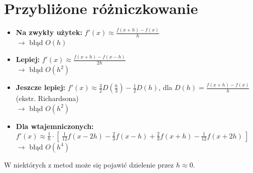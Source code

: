 \section{Przybliżone różniczkowanie}
\begin{itemize}
	\item \textbf{Na zwykły użytek:} \( f'(x) \approx \frac{f(x+h) - f(x)}{h} \) \\
	      \( \rightarrow \) błąd \( O(h) \)
	\item \textbf{Lepiej:} \( f'(x) \approx \frac{f(x+h) - f(x-h)}{2h} \) \\
	      \( \rightarrow \) błąd \( O(h^2) \)
	\item \textbf{Jeszcze lepiej:} \( f'(x) \approx \frac{3}{2}D\!\left(\frac{h}{3}\right) - \frac{1}{2}D(h) \), dla \( D(h) = \frac{f(x+h) - f(x)}{h} \) \quad (ekstr. Richardsona) \\
	      \( \rightarrow \) błąd \( O(h^2) \)
	\item \textbf{Dla wtajemniczonych:} \( f'(x) \approx \frac{1}{h} \cdot \left[\: \frac{1}{12}f(x-2h) - \frac{2}{3}f(x-h) + \frac{2}{3}f(x+h) - \frac{1}{12}f(x+2h) \:\right] \) \\
	      \( \rightarrow \) błąd \( O(h^4) \)
\end{itemize}

W niektórych z metod może się pojawić dzielenie przez \( h \approx 0 \).